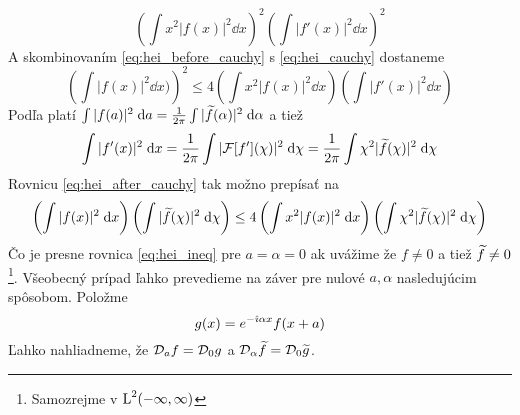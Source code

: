 \begin{dokaz}
\begin{equation}
            \left( \int x^2 |f(x)|^2 \dd x \right)^2
            \left( \int |f'(x)|^2 \dd x \right)^2
        \label{eq:hei_cauchy}
    \end{equation}
    A skombinovaním \ref{eq:hei_before_cauchy} s \ref{eq:hei_cauchy}
    dostaneme
    \begin{equation}
        \left( \int |f(x)|^2 \dd x)\right)^2 \le 4
            \left( \int x^2 |f(x)|^2 \dd x \right)
            \left( \int |f'(x)|^2 \dd x \right)            
        \label{eq:hei_after_cauchy}
    \end{equation}
    Podľa  platí
    $\int |f(a)|^2 \; \mathrm{d} a = \frac{1}{2\pi} \int |\widetilde{f}(\alpha)|^2 \; \mathrm{d}
    \alpha$ a tiež 
    \begin{equation}
        \int |f'(x)|^2 \; \mathrm{d} x = \frac{1}{2 \pi}
            \int |\mathcal{F}[f'](\chi)|^2 \; \mathrm{d} \chi = 
            \frac{1}{2 \pi} \int \chi^2 |\widetilde{f}(\chi)|^2 \; \mathrm{d} \chi
    \end{equation}
    Rovnicu \ref{eq:hei_after_cauchy} tak možno prepísať na
    \begin{equation}
        \left( \int |f(x)|^2 \; \mathrm{d} x \right)
        \left( \int |\widetilde{f}(\chi)|^2 \; \mathrm{d} \chi \right)
        \le 4
        \left(\int x^2 |f(x)|^2 \; \mathrm{d} x \right)
        \left(\int \chi^2 |\widetilde{f}(\chi)|^2 \; \mathrm{d} \chi\right)
    \end{equation}
    Čo je presne rovnica \ref{eq:hei_ineq} pre $a=\alpha=0$ ak uvážime že
    $f\not=0$ a tiež $\widetilde{f}\not=0$ \footnote{Samozrejme v $\mbox{L}^2(-\infty,\infty)$}.
    Všeobecný prípad ľahko prevedieme na záver pre nulové $a,\alpha$
    nasledujúcim spôsobom.
    Položme
    \begin{equation}
        g(x) = e^{-\hat{\imath} \alpha x} f(x + a)
    \end{equation}
     Ľahko nahliadneme, že $\mathcal{D}_{a} f = \mathcal{D}_{0}g$ a 
    $\mathcal{D}_{\alpha}\widetilde{f} = \mathcal{D}_{0}\widetilde{g}$.
\end{dokaz}


